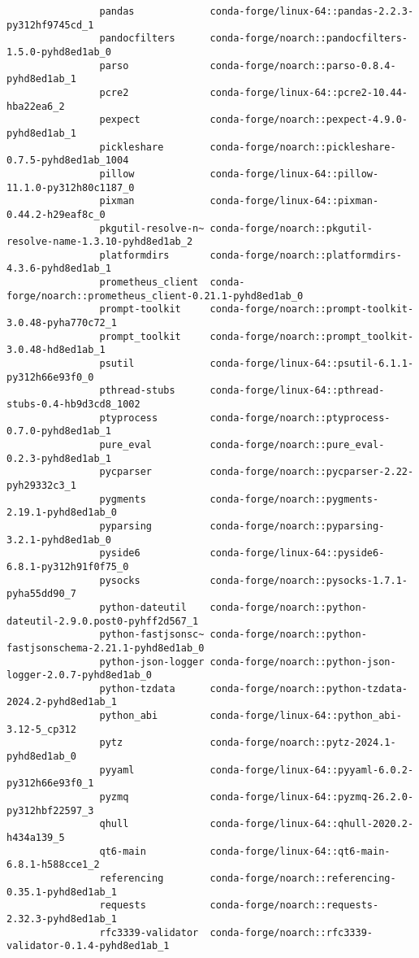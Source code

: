 \documentclass{article}
\begin{document}
\begin{itemize}
\begin{itemize}
\begin{itemize}
\begin{verbatim}
				pandas             conda-forge/linux-64::pandas-2.2.3-py312hf9745cd_1 
				pandocfilters      conda-forge/noarch::pandocfilters-1.5.0-pyhd8ed1ab_0 
				parso              conda-forge/noarch::parso-0.8.4-pyhd8ed1ab_1 
				pcre2              conda-forge/linux-64::pcre2-10.44-hba22ea6_2 
				pexpect            conda-forge/noarch::pexpect-4.9.0-pyhd8ed1ab_1 
				pickleshare        conda-forge/noarch::pickleshare-0.7.5-pyhd8ed1ab_1004 
				pillow             conda-forge/linux-64::pillow-11.1.0-py312h80c1187_0 
				pixman             conda-forge/linux-64::pixman-0.44.2-h29eaf8c_0 
				pkgutil-resolve-n~ conda-forge/noarch::pkgutil-resolve-name-1.3.10-pyhd8ed1ab_2 
				platformdirs       conda-forge/noarch::platformdirs-4.3.6-pyhd8ed1ab_1 
				prometheus_client  conda-forge/noarch::prometheus_client-0.21.1-pyhd8ed1ab_0 
				prompt-toolkit     conda-forge/noarch::prompt-toolkit-3.0.48-pyha770c72_1 
				prompt_toolkit     conda-forge/noarch::prompt_toolkit-3.0.48-hd8ed1ab_1 
				psutil             conda-forge/linux-64::psutil-6.1.1-py312h66e93f0_0 
				pthread-stubs      conda-forge/linux-64::pthread-stubs-0.4-hb9d3cd8_1002 
				ptyprocess         conda-forge/noarch::ptyprocess-0.7.0-pyhd8ed1ab_1 
				pure_eval          conda-forge/noarch::pure_eval-0.2.3-pyhd8ed1ab_1 
				pycparser          conda-forge/noarch::pycparser-2.22-pyh29332c3_1 
				pygments           conda-forge/noarch::pygments-2.19.1-pyhd8ed1ab_0 
				pyparsing          conda-forge/noarch::pyparsing-3.2.1-pyhd8ed1ab_0 
				pyside6            conda-forge/linux-64::pyside6-6.8.1-py312h91f0f75_0 
				pysocks            conda-forge/noarch::pysocks-1.7.1-pyha55dd90_7 
				python-dateutil    conda-forge/noarch::python-dateutil-2.9.0.post0-pyhff2d567_1 
				python-fastjsonsc~ conda-forge/noarch::python-fastjsonschema-2.21.1-pyhd8ed1ab_0 
				python-json-logger conda-forge/noarch::python-json-logger-2.0.7-pyhd8ed1ab_0 
				python-tzdata      conda-forge/noarch::python-tzdata-2024.2-pyhd8ed1ab_1 
				python_abi         conda-forge/linux-64::python_abi-3.12-5_cp312 
				pytz               conda-forge/noarch::pytz-2024.1-pyhd8ed1ab_0 
				pyyaml             conda-forge/linux-64::pyyaml-6.0.2-py312h66e93f0_1 
				pyzmq              conda-forge/linux-64::pyzmq-26.2.0-py312hbf22597_3 
				qhull              conda-forge/linux-64::qhull-2020.2-h434a139_5 
				qt6-main           conda-forge/linux-64::qt6-main-6.8.1-h588cce1_2 
				referencing        conda-forge/noarch::referencing-0.35.1-pyhd8ed1ab_1 
				requests           conda-forge/noarch::requests-2.32.3-pyhd8ed1ab_1 
				rfc3339-validator  conda-forge/noarch::rfc3339-validator-0.1.4-pyhd8ed1ab_1 

\end{verbatim}
\end{itemize}
\end{itemize}
\end{itemize}
\end{document}
